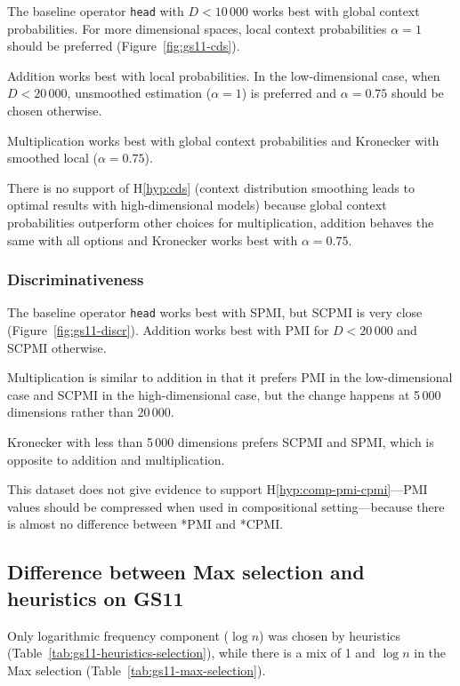 The baseline operator \texttt{head} with $D < 10\,000$ works best with global context probabilities. For more dimensional spaces, local context probabilities $\alpha = 1$ should be preferred (Figure~\ref{fig:gs11-cds}).

Addition works best with local probabilities. In the low-dimensional case, when $D < 20\,000$, unsmoothed estimation ($\alpha = 1$) is preferred and $\alpha = 0.75$ should be chosen otherwise.

Multiplication works best with global context probabilities and Kronecker with smoothed local ($\alpha = 0.75$).

There is no support of H\ref{hyp:cds} (context distribution smoothing leads to optimal results with high-dimensional models) because global context probabilities outperform other choices for multiplication, addition behaves the same with all options and Kronecker works best with $\alpha = 0.75$.



\subsubsection{Discriminativeness}



The baseline operator \texttt{head} works best with SPMI, but SCPMI is very close (Figure~\ref{fig:gs11-discr}). Addition works best with PMI for $D < 20\,000$ and SCPMI otherwise.

Multiplication is similar to addition in that it prefers PMI in the low-dimensional case and SCPMI in the high-dimensional case, but the change happens at 5\,000 dimensions rather than 20\,000.

Kronecker with less than 5\,000 dimensions prefers SCPMI and SPMI, which is opposite to addition and multiplication.

This dataset does not give evidence to support H\ref{hyp:comp-pmi-cpmi}---PMI values should be compressed when used in compositional setting---because there is almost no difference between *PMI and *CPMI.

\subsection{Difference between Max selection and heuristics on GS11}

Only logarithmic frequency component ($\log n$) was chosen by heuristics (Table~\ref{tab:gs11-heuristics-selection}), while there is a mix of 1 and $\log n$ in the Max selection (Table~\ref{tab:gs11-max-selection}).

